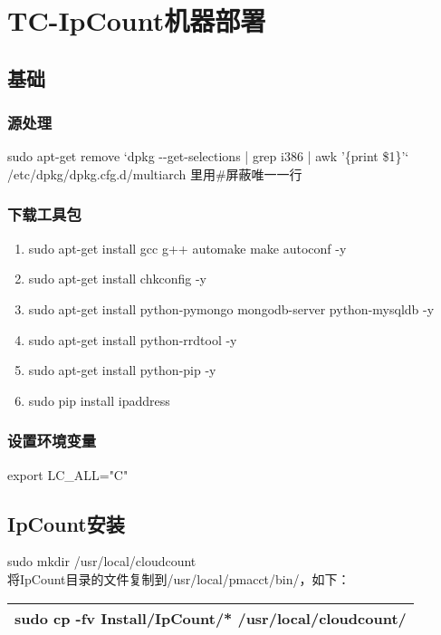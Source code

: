 \documentclass[10pt]{article}
\begin{document}
\section{TC-IpCount机器部署}
\subsection{基础}
\subsubsection{源处理}
    sudo apt-get remove `dpkg -{}-get-selections | grep i386 | awk '\{print \$1\}'` \\
/etc/dpkg/dpkg.cfg.d/multiarch 里用\#屏蔽唯一一行 \\
\subsubsection{下载工具包}
\begin{enumerate}
	\item sudo apt-get install gcc g++ automake make autoconf -y
	\item sudo apt-get install chkconfig -y	
	\item sudo apt-get install python-pymongo mongodb-server python-mysqldb -y
	\item sudo apt-get install python-rrdtool -y 
	\item sudo apt-get install python-pip -y
	\item sudo pip install ipaddress 
\end{enumerate}

\subsubsection{设置环境变量}
export LC\_ALL="C" 
\bigskip

\subsection{IpCount安装}
sudo mkdir /usr/local/cloudcount \\
将IpCount目录的文件复制到/usr/local/pmacct/bin/，如下： \\

\begin{center}
\begin{tabular}{|p{10cm}|}
\hline
    sudo cp -fv Install/IpCount/* /usr/local/cloudcount/
\\\hline
\end{tabular}
\end{center}
\end{document}
